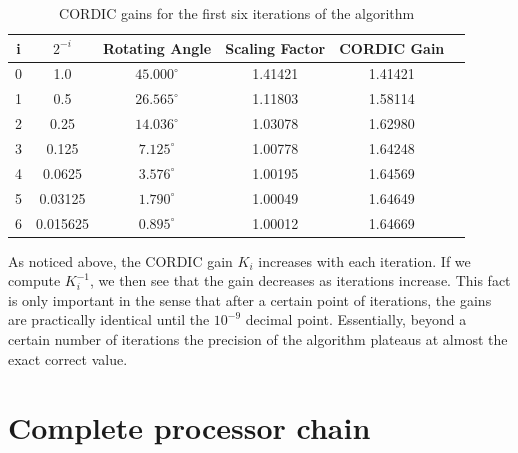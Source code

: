 \documentclass[11pt]{report}
\begin{document}
\begin{table}
\begin{center}
\begin{tabular}{|c|c|c|c|c|c|}
\hline
i & $2^{-i}$ 	& Rotating Angle  	& Scaling Factor 	& CORDIC Gain 	\\ \hline \hline
0 & 1.0 		& $45.000^{\circ}$	& 1.41421			& 1.41421		\\ \hline
1 & 0.5 		& $26.565^{\circ}$	& 1.11803			& 1.58114		\\ \hline
2 & 0.25 		& $14.036^{\circ}$	& 1.03078			& 1.62980		\\ \hline
3 & 0.125 		& $7.125^{\circ}$	& 1.00778			& 1.64248		\\ \hline
4 & 0.0625 	& $3.576^{\circ}$	& 1.00195			& 1.64569		\\ \hline
5 & 0.03125 	& $1.790^{\circ}$	& 1.00049			& 1.64649		\\ \hline
6 & 0.015625 	& $0.895^{\circ}$	& 1.00012			& 1.64669		\\ \hline
\end{tabular}
\end{center}
\caption{CORDIC gains for the first six iterations of the algorithm}
\label{table:cordic}
\end{table}
\FloatBarrier

As noticed above, the CORDIC gain $K_i$ increases with each iteration. If we compute $K_i ^{-1}$, we then see that the gain decreases as iterations increase. This fact is only important in the sense that after a certain point of iterations, the gains are practically identical until the $10^{-9}$ decimal point. Essentially, beyond a certain number of iterations the precision of the algorithm plateaus at almost the exact correct value.









\chapter{Complete processor chain}
\end{document}
